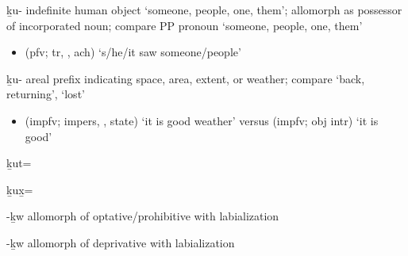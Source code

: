 \begin{morphdesc}[resume*=alphalist]
\item[ḵu-]\label{m:ḵu-indef}
	indefinite human object ‘someone, people, one, them’;
	allomorph  as possessor of incorporated noun;
	compare PP pronoun  ‘someone, people, one, them’
	\begin{itemize}
	\item	{} (pfv; tr, , ach) ‘s/he/it saw someone/people’
	\end{itemize}

\item[ḵu-]\label{m:ḵu-areal}
	areal prefix indicating space, area, extent, or weather;
	compare  ‘back, returning’,  ‘lost’
	\begin{itemize}
	\item	{} (impfv; impers, ,  state) ‘it is good weather’\newline
		versus  (impfv; obj intr) ‘it is good’
	\end{itemize}

\item[ḵut=]\label{m:ḵut=}

\item[ḵux̱=]\label{m:ḵux̱=}

\item[-ḵw]\label{m:-ḵw-optphib}
	allomorph of optative/prohibitive  with labialization

\item[-ḵw]\label{m:-ḵw-dprv}
	allomorph of deprivative  with labialization


\end{morphdesc}

